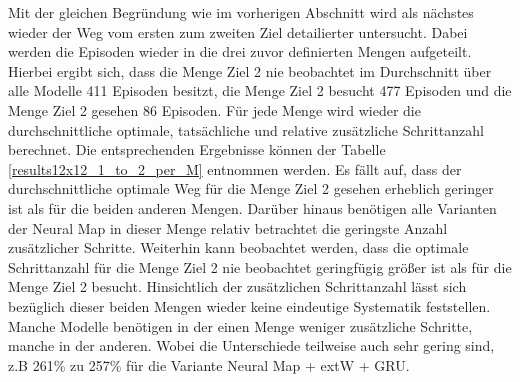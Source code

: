 Mit der gleichen Begründung wie im vorherigen Abschnitt wird als nächstes wieder der Weg vom ersten zum zweiten Ziel detailierter untersucht. Dabei werden die Episoden wieder in die drei zuvor definierten Mengen aufgeteilt. Hierbei ergibt sich, dass die Menge \glqq Ziel 2 nie beobachtet\grqq{} im Durchschnitt über alle Modelle 411 Episoden besitzt, die Menge \glqq Ziel 2 besucht\grqq{} 477 Episoden und die Menge \glqq Ziel 2 gesehen\grqq{} 86 Episoden. Für jede Menge wird wieder die durchschnittliche optimale, tatsächliche und relative zusätzliche Schrittanzahl berechnet. Die entsprechenden Ergebnisse können der Tabelle \ref{results12x12_1_to_2_per_M} entnommen werden. Es fällt auf, dass der durchschnittliche optimale Weg für die Menge \glqq Ziel 2 gesehen\grqq{} erheblich geringer ist als für die beiden anderen Mengen. Darüber hinaus benötigen alle Varianten der Neural Map in dieser Menge relativ betrachtet die geringste Anzahl zusätzlicher Schritte. Weiterhin kann beobachtet werden, dass die optimale Schrittanzahl für die Menge \glqq Ziel 2 nie beobachtet\grqq{} geringfügig größer ist als für die Menge \glqq Ziel 2 besucht\grqq{}. Hinsichtlich der zusätzlichen Schrittanzahl lässt sich bezüglich dieser beiden Mengen wieder keine eindeutige Systematik feststellen. Manche Modelle benötigen in der einen Menge weniger zusätzliche Schritte, manche in der anderen. Wobei die Unterschiede teilweise auch sehr gering sind, z.B 261\% zu 257\% für die Variante Neural Map + extW + GRU.

